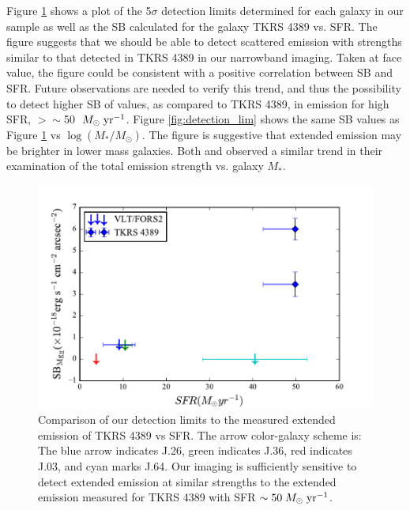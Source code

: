 \documentclass[twocolumn]{aastex61}
\def \msunperyr {{\; M_{\odot}\rm \;yr^{-1}}}
\begin{document}
Figure \ref{fig:SFR_lim} shows a plot of the 5$\sigma$ detection limits determined for each galaxy in our sample as well as the SB calculated for the galaxy TKRS 4389 vs. SFR. The figure suggests that we should be able to detect scattered  emission with strengths similar to that detected in TKRS 4389 in our narrowband imaging. Taken at face value, the figure could be consistent with a positive correlation between  SB and SFR. Future observations are needed to verify this trend, and thus the possibility to detect higher SB of values, as compared to TKRS 4389,  in emission for high SFR, $>\sim$50 $\msunperyr$. Figure \ref{fig:detection_lim} shows the same SB values as Figure \ref{fig:SFR_lim} vs $\log(M_*/M_{\odot})$. The figure is suggestive that extended  emission may be brighter in lower mass galaxies. Both \cite{Erb2012} and \cite{Feltre2018} observed a similar trend in their examination of the total  emission strength vs. galaxy $M_*$.

\begin{figure}[!htb]
\centering
\includegraphics[scale=0.6]{../Figures/limits.pdf}
\caption{Comparison of our detection limits to the measured extended emission of TKRS 4389 vs SFR. The arrow color-galaxy scheme is: The blue arrow indicates J.26, green indicates J.36, red indicates J.03, and cyan marks J.64. Our imaging is sufficiently sensitive to detect extended emission at similar strengths to the extended emission measured for TKRS 4389 with SFR $\sim 50 \msunperyr$.}
\label{fig:SFR_lim}
\end{figure}
\end{document}
